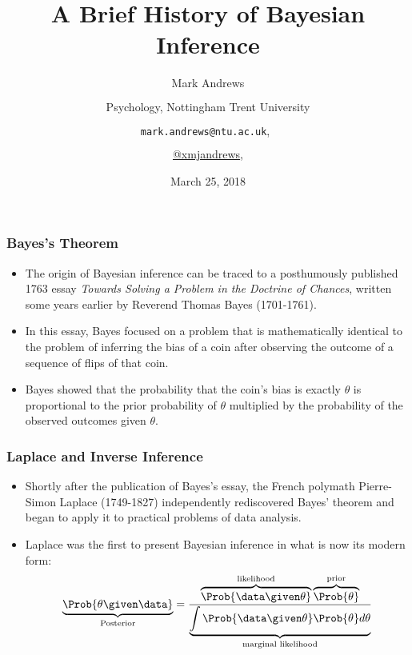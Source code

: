 \documentclass{slides}
\title{A Brief History of Bayesian Inference}
\author[Andrews]{Mark Andrews\\ $\phantom{foo}$ \\ Psychology, Nottingham Trent University \\ $\phantom{foo}$ \\ \faEnvelopeO \  \texttt{mark.andrews@ntu.ac.uk},\ \faEnvelopeO\  \\ $\phantom{foo}$ \\ \faTwitter \href{https://twitter.com/xmjandrews}{@xmjandrews}, }
\date{March 25, 2018}
\begin{document}
{
	\begin{frame}
		\titlepage
	\end{frame}
}


\begin{frame}
	\frametitle{Bayes's Theorem}
	\begin{itemize}

	\item  The origin of Bayesian inference can be traced to a posthumously published 1763 essay
		\emph{Towards Solving a Problem in the Doctrine of Chances},
		written some years earlier by Reverend Thomas Bayes
		(1701-1761). 

	\item In this essay, Bayes focused on a problem that is mathematically
		identical to the problem of inferring the bias of a coin after
		observing the outcome of a sequence of flips of that coin.  
		
	\item Bayes showed that the probability that the coin's bias is exactly
		$\theta$ is proportional to the prior probability of $\theta$
		multiplied by the probability of the observed outcomes given
		$\theta$.
\end{itemize}
\end{frame}

\begin{frame}
	\frametitle{Laplace and Inverse Inference}
	\begin{itemize}
		\item Shortly after the publication of Bayes's essay,  the
			French polymath Pierre-Simon Laplace (1749-1827)
			independently rediscovered Bayes' theorem and began to
			apply it to practical problems of data analysis.


	\item Laplace was the first to present Bayesian inference in what is now its modern form:
		\[
			\underbrace{\Prob{\theta \given \data}}_{\text{Posterior}}
			= 
			\frac{\overbrace{\Prob{\data \given \theta}}^{\text{likelihood}}
				\overbrace{\Prob{\theta}}^{\text{prior}}}
				{\underbrace{\int \Prob{\data \given \theta}\Prob{\theta} d\theta}_{\text{marginal likelihood}}}
		\]

\end{itemize}
\end{frame}
\end{document}
